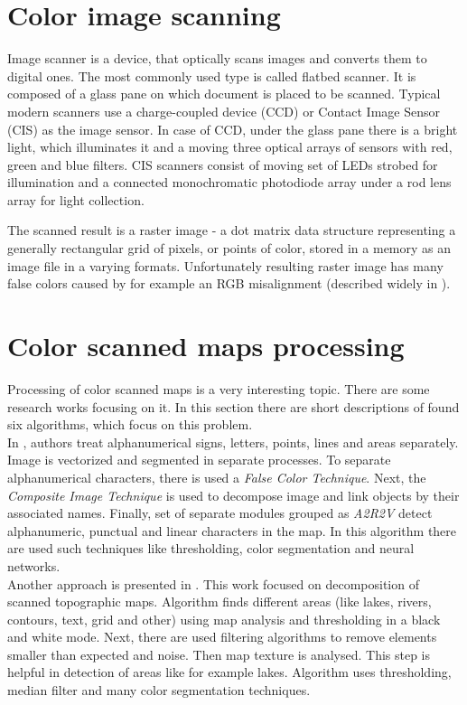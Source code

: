 \documentclass[a4paper,onecolumn,oneside,12pt]{memoir}
\begin{document}
\section{Color image scanning}

Image scanner \cite{imageScanner} is a device, that optically scans images and
converts them to digital ones. The most commonly used type is called flatbed scanner. It is composed
of a glass pane on which document is placed to be scanned. Typical modern scanners use a 
charge-coupled device (CCD) or Contact Image Sensor (CIS) as the image sensor. In case of CCD, under
the glass pane there is a bright light, which illuminates it and a moving three optical arrays of
sensors with red, green and blue filters. CIS scanners consist of moving set of LEDs strobed for
illumination and a connected monochromatic photodiode array under a rod lens array for light
collection.

The scanned result is a raster image - a dot matrix data structure representing a generally
rectangular grid of pixels, or points of color, stored in a memory as an image file in a varying
formats. Unfortunately resulting raster image has many false colors caused by for example an RGB
misalignment (described widely in \cite{colorMapSegmentation}).

\section{Color scanned maps processing}

Processing of color scanned maps is a very interesting topic. There are some research works focusing
on it. In this section there are short descriptions of found six algorithms, which focus on this
problem. \\

In \cite{semanticAnalysisAndRecognition}, authors treat alphanumerical signs, letters, points, lines
and areas separately. Image is vectorized and segmented in separate processes. To separate 
alphanumerical characters, there is used a \textit{False Color Technique}. Next, the 
\textit{Composite Image Technique} is used to decompose image and link objects by their associated
names. Finally, set of separate modules grouped as \textit{A2R2V} detect alphanumeric, punctual and
linear characters in the map. In this algorithm there are used such techniques like thresholding,
color segmentation and neural networks. \\

Another approach is presented in \cite{comparativeAnalysisOfScannedMaps}. This work focused on 
decomposition of scanned topographic maps. Algorithm finds different areas (like lakes, rivers,
contours, text, grid and other) using map analysis and thresholding in a black and white mode.
Next, there are used filtering algorithms to remove elements smaller than expected and noise.
Then map texture is analysed. This step is helpful in detection of areas like for example lakes.
Algorithm uses thresholding, median filter and many color segmentation techniques. \\
\end{document}
